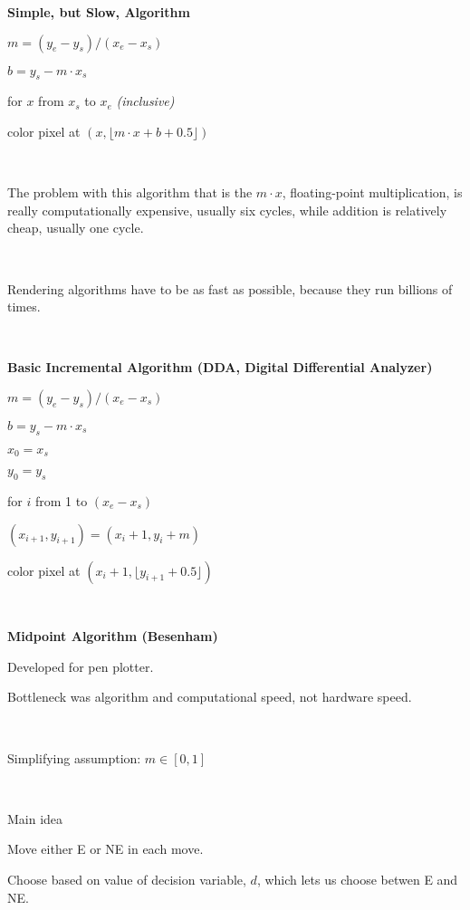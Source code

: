 \documentclass[12pt]{article}
\begin{document}
\begin{spacing}{1.2}
{\bf Simple, but Slow, Algorithm}

$m = (y_e - y_s) / (x_e - x_s)$

$b = y_s - m \cdot x_s$

for $x$ from $x_s$ to $x_e$ {\color{red} \it (inclusive)}

\qquad color pixel at $(x, \lfloor m \cdot x + b + 0.5 \rfloor)$

\

The problem with this algorithm that is the $m \cdot x$, floating-point multiplication, is really computationally expensive, usually six cycles, while addition is relatively cheap, usually one cycle.  

\

Rendering algorithms have to be as fast as possible, because they run billions of times.  

\

{\bf Basic Incremental Algorithm (DDA, Digital Differential Analyzer)}

$m = (y_e - y_s) / (x_e - x_s)$

$b = y_s - m \cdot x_s$

$x_0 = x_s$

$y_0 = y_s$

for $i$ from 1 to $(x_e - x_s)$

\qquad $(x_{i+1}, y_{i+1}) = (x_i + 1, y_i + m)$

\qquad color pixel at $(x_i+1, \lfloor y_{i+1} + 0.5 \rfloor )$ 

\

{\bf Midpoint Algorithm (Besenham)}

Developed for pen plotter.

Bottleneck was algorithm and computational speed, not hardware speed.

\

Simplifying assumption:  $m \in [0,1]$

\

Main idea

\qquad Move either E or NE in each move.  

\qquad Choose based on value of decision variable, $d$, which lets us choose betwen E and NE.  

\

\

\hfil{}


\end{spacing}
\end{document}
